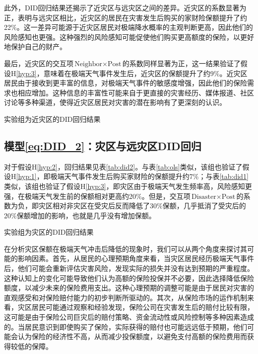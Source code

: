 此外，DID回归结果还揭示了近灾区与远灾区之间的差异。近灾区的系数显著为正，表明与远灾区相比，近灾区的居民在灾害发生后购买的家财险保额提升了约22\%。这一差异可能源于近灾区居民对极端降水概率的主观判断更高，因此他们的风险感知也更强。这种强烈的风险感知可能促使他们购买更高额度的保险，以更好地保护自己的财产。

最后，近灾区的交互项$\text{Neighbor}\times \text{Post}$的系数同样显著为正，这一结果验证了假设H\ref{hyp:3}，意味着在极端天气事件发生后，近灾区的保额提升了约9\%。近灾区居民由于接收到更丰富的信息，对极端天气事件的敏感度增强，因此他们的保险需求也相应增加。这种信息的丰富性可能来自于更直接的灾害经历、媒体报道、社区讨论等多种渠道，使得近灾区居民对灾害的潜在影响有了更深刻的认识。

\begin{table}[htbp]
    \centering
    \caption{实验组为近灾区的DID回归结果}\label{tab:did1}
    
\end{table}

\subsection{模型\ref{eq:DID_2}：灾区与远灾区DID回归}
对于假设H\ref{hyp:2}，回归结果见表\ref{tab:did2}。与表\ref{tab:ols}类似，该组也验证了假设H\ref{hyp:1}，即极端天气事件发生后购买家财险的保额提升约7\%；与表\ref{tab:did1}类似，该组也验证了假设H\ref{hyp:3}，即灾区由于极端天气发生频率高，风险感知更强，在极端天气发生前的保额相对更高约20\%。但是，交互项$\text{Disaster}\times \text{Post}$的系数为负，即灾区相对非灾区在受灾后反而降低了30\%保额，几乎抵消了受灾后的20\%保额增加的影响，也就是几乎没有增加保额。
\begin{table}[htbp]
    \centering
    \caption{实验组为灾区的DID回归结果}\label{tab:did2}
    
\end{table}

在分析灾区保额在极端天气冲击后降低的现象时，我们可以从两个角度来探讨其可能的影响因素。首先，从居民的心理预期角度来看，当灾区居民经历极端天气事件后，他们可能会重新评估灾害风险，发现实际的损失并没有达到预期的严重程度。这种认知上的变化可能导致他们认为高额的保险投保并不必要，因此选择降低保险额度，以减少未来的保险费用支出。这种心理预期的调整可能是由于居民对灾害的直观感受和对保险赔付能力的初步判断所驱动的。其次，从保险市场的运作机制来看，灾区居民可能通过观察和经验发现，保险公司在灾害发生后的赔付比较有限，这可能是由于保险公司巨灾后的赔付策略、资金流动性或风险控制等多种因素造成的\citep{田玲2009中国财产保险业巨灾损失赔付能力实证研究}。当居民意识到即使购买了保险，实际获得的赔付也可能远远低于预期，他们可能会认为保险的经济性不高，从而减少投保额度，以避免支付高额的保险费用而获得较低的保障。


